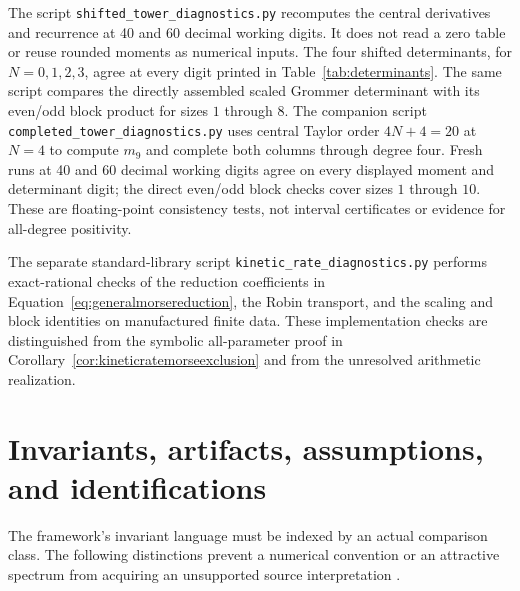 \documentclass[11pt,letterpaper]{article}
\numberwithin{equation}{section}
\theoremstyle{definition}
\theoremstyle{remark}
\begin{document}
The script \texttt{shifted\_tower\_diagnostics.py} recomputes the central derivatives and recurrence at 40 and 60 decimal working digits. It does not read a zero table or reuse rounded moments as numerical inputs. The four shifted determinants, for $N=0,1,2,3$, agree at every digit printed in Table~\ref{tab:determinants}. The same script compares the directly assembled scaled Grommer determinant with its even/odd block product for sizes $1$ through $8$. The companion script \texttt{completed\_tower\_diagnostics.py} uses central Taylor order $4N+4=20$ at $N=4$ to compute $m_9$ and complete both columns through degree four. Fresh runs at 40 and 60 decimal working digits agree on every displayed moment and determinant digit; the direct even/odd block checks cover sizes $1$ through $10$. These are floating-point consistency tests, not interval certificates or evidence for all-degree positivity.

The separate standard-library script \texttt{kinetic\_rate\_diagnostics.py} performs exact-rational checks of the reduction coefficients in Equation~\eqref{eq:generalmorsereduction}, the Robin transport, and the scaling and block identities on manufactured finite data. These implementation checks are distinguished from the symbolic all-parameter proof in Corollary~\ref{cor:kineticratemorseexclusion} and from the unresolved arithmetic realization.

\section{Invariants, artifacts, assumptions, and identifications}
\label{sec:classification}
The framework's invariant language must be indexed by an actual comparison class. The following distinctions prevent a numerical convention or an attractive spectrum from acquiring an unsupported source interpretation \cite{tcgsfoundation,tcgsoperator}.
\end{document}
